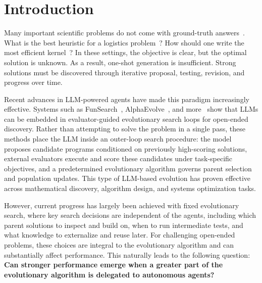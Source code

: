 
\vspace{-6pt}
\section{Introduction}
\vspace{-2pt}



Many important scientific problems do not come with ground-truth answers~\citep{mang2025frontiercs}. What is the best heuristic for a logistics problem~\citep{chen2025heurigym, zheng2026learning}? How should one write the most efficient kernel~\citep{ouyangkernelbench}? In these settings, the objective is clear, but the optimal solution is unknown. As a result, one-shot generation is insufficient. Strong solutions must be discovered through iterative proposal, testing, revision, and progress over time. 

Recent advances in LLM-powered agents have made this paradigm increasingly effective. Systems such as FunSearch~\citep{romera2024funsearch}, AlphaEvolve~\citep{novikov2025alphaevolve}, and more~\citep{lange2025shinkaevolve,agrawal2025gepa,cemri2026adaevolve} show that LLMs can be embedded in evaluator-guided evolutionary search loops for open-ended discovery. Rather than attempting to solve the problem in a single pass, these methods place the LLM inside an outer-loop search procedure: the model proposes candidate programs conditioned on previously high-scoring solutions, external evaluators execute and score these candidates under task-specific objectives, and a predetermined evolutionary algorithm governs parent selection and population updates. This type of LLM-based evolution has proven effective across mathematical discovery, algorithm design, and systems optimization tasks.





However, current progress has largely been achieved with fixed evolutionary search, where key search decisions are independent of the agents, including which parent solutions to inspect and build on, when to run intermediate tests, and what knowledge to externalize and reuse later. For challenging open-ended problems, these choices are integral to the evolutionary algorithm and can substantially affect performance. This naturally leads to the following question: \textbf{Can stronger performance emerge when a greater part of the evolutionary algorithm is delegated to autonomous agents?}

